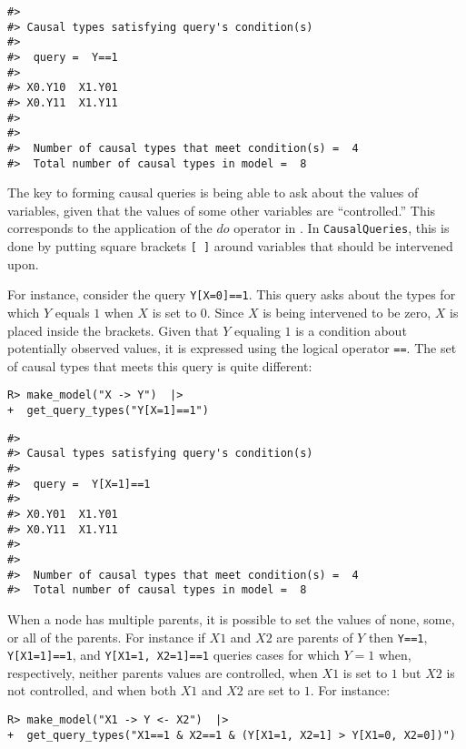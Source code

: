 \documentclass[
  11pt,
  article]{jss}
\begin{document}
\begin{verbatim}
#> 
#> Causal types satisfying query's condition(s)  
#> 
#>  query =  Y==1 
#> 
#> X0.Y10  X1.Y01
#> X0.Y11  X1.Y11
#> 
#> 
#>  Number of causal types that meet condition(s) =  4
#>  Total number of causal types in model =  8
\end{verbatim}

The key to forming causal queries is being able to ask about the values
of variables, given that the values of some other variables are
``controlled.'' This corresponds to the application of the \(do\)
operator in \citet{pearl_causality_2009}. In \texttt{CausalQueries},
this is done by putting square brackets \texttt{{[}\ {]}} around
variables that should be intervened upon.

For instance, consider the query \texttt{Y{[}X=0{]}==1}. This query asks
about the types for which \(Y\) equals \(1\) when \(X\) is set to \(0\).
Since \(X\) is being intervened to be zero, \(X\) is placed inside the
brackets. Given that \(Y\) equaling \(1\) is a condition about
potentially observed values, it is expressed using the logical operator
\texttt{==}. The set of causal types that meets this query is quite
different:

\begin{verbatim}
R> make_model("X -> Y")  |> 
+  get_query_types("Y[X=1]==1")
\end{verbatim}

\begin{verbatim}
#> 
#> Causal types satisfying query's condition(s)  
#> 
#>  query =  Y[X=1]==1 
#> 
#> X0.Y01  X1.Y01
#> X0.Y11  X1.Y11
#> 
#> 
#>  Number of causal types that meet condition(s) =  4
#>  Total number of causal types in model =  8
\end{verbatim}

When a node has multiple parents, it is possible to set the values of
none, some, or all of the parents. For instance if \(X1\) and \(X2\) are
parents of \(Y\) then \texttt{Y==1}, \texttt{Y{[}X1=1{]}==1}, and
\texttt{Y{[}X1=1,\ X2=1{]}==1} queries cases for which \(Y=1\) when,
respectively, neither parents values are controlled, when \(X1\) is set
to \(1\) but \(X2\) is not controlled, and when both \(X1\) and \(X2\)
are set to \(1\). For instance:

\begin{verbatim}
R> make_model("X1 -> Y <- X2")  |>
+  get_query_types("X1==1 & X2==1 & (Y[X1=1, X2=1] > Y[X1=0, X2=0])")
\end{verbatim}
\end{document}
